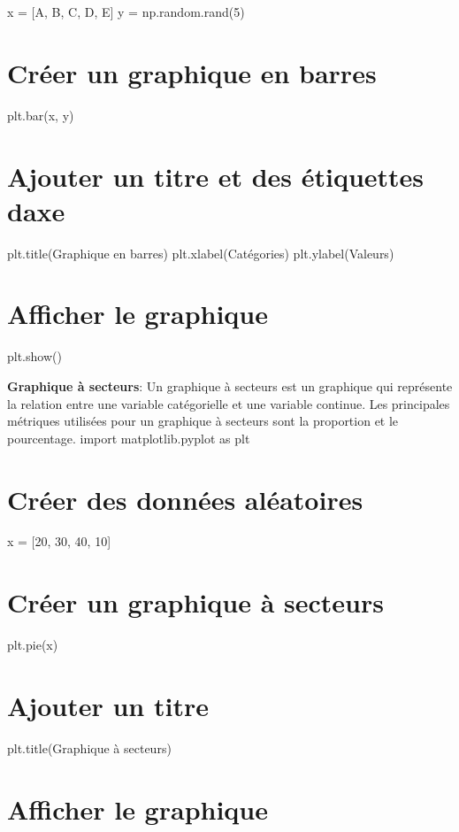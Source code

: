 x = \mbox{[}\textquotesingle{}A\textquotesingle{}, \textquotesingle{}B\textquotesingle{}, \textquotesingle{}C\textquotesingle{}, \textquotesingle{}D\textquotesingle{}, \textquotesingle{}E\textquotesingle{}\mbox{]} y = np.\+random.\+rand(5) \section*{Créer un graphique en barres}

plt.\+bar(x, y) \section*{Ajouter un titre et des étiquettes d\textquotesingle{}axe}

plt.\+title(\textquotesingle{}Graphique en barres\textquotesingle{}) plt.\+xlabel(\textquotesingle{}Catégories\textquotesingle{}) plt.\+ylabel(\textquotesingle{}Valeurs\textquotesingle{}) \section*{Afficher le graphique}

plt.\+show()


\begin{DoxyEnumerate}
\item {\bfseries Graphique à secteurs}\+: Un graphique à secteurs est un graphique qui représente la relation entre une variable catégorielle et une variable continue. Les principales métriques utilisées pour un graphique à secteurs sont la proportion et le pourcentage. import matplotlib.\+pyplot as plt \section*{Créer des données aléatoires}
\end{DoxyEnumerate}

x = \mbox{[}20, 30, 40, 10\mbox{]} \section*{Créer un graphique à secteurs}

plt.\+pie(x) \section*{Ajouter un titre}

plt.\+title(\textquotesingle{}Graphique à secteurs\textquotesingle{}) \section*{Afficher le graphique}

